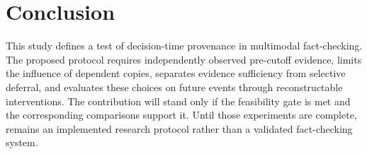 \section{Conclusion}

This study defines a test of decision-time provenance in multimodal fact-checking. The proposed protocol requires independently observed pre-cutoff evidence, limits the influence of dependent copies, separates evidence sufficiency from selective deferral, and evaluates these choices on future events through reconstructable interventions. The contribution will stand only if the feasibility gate is met and the corresponding comparisons support it. Until those experiments are complete, \systemname{} remains an implemented research protocol rather than a validated fact-checking system.

